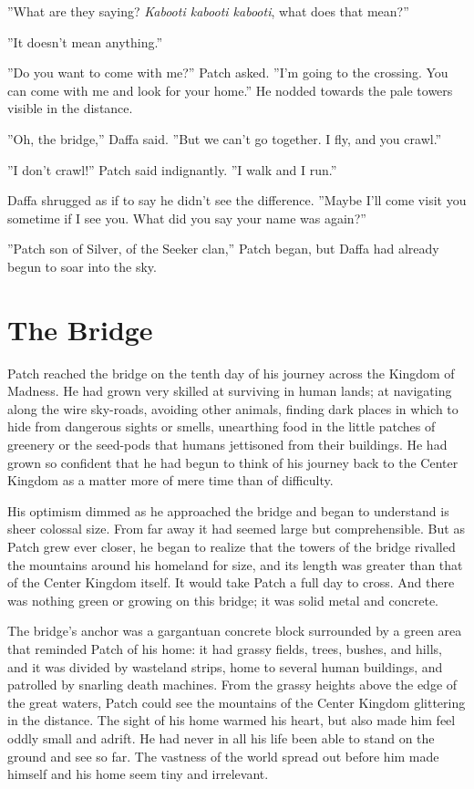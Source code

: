 \documentclass[12pt]{book}
\begin{document}
''What are they saying? {\it Kabooti kabooti kabooti}, what does that mean?''

''It doesn't mean anything.''

''Do you want to come with me?'' Patch asked. ''I'm going to the crossing. You can come with me and look for your home.'' He nodded towards the pale towers visible in the distance.

''Oh, the bridge,'' Daffa said. ''But we can't go together. I fly, and you crawl.''

''I don't crawl!'' Patch said indignantly. ''I walk and I run.''

Daffa shrugged as if to say he didn't see the difference. ''Maybe I'll come visit you sometime if I see you. What did you say your name was again?''

''Patch son of Silver, of the Seeker clan,'' Patch began, but Daffa had already begun to soar into the sky.


\section{The Bridge}

Patch reached the bridge on the tenth day of his journey across the Kingdom of Madness. He had grown very skilled at surviving in human lands; at navigating along the wire sky-roads, avoiding other animals, finding dark places in which to hide from dangerous sights or smells, unearthing food in the little patches of greenery or the seed-pods that humans jettisoned from their buildings. He had grown so confident that he had begun to think of his journey back to the Center Kingdom as a matter more of mere time than of difficulty.

His optimism dimmed as he approached the bridge and began to understand is sheer colossal size. From far away it had seemed large but comprehensible. But as Patch grew ever closer, he began to realize that the towers of the bridge rivalled the mountains around his homeland for size, and its length was greater than that of the Center Kingdom itself. It would take Patch a full day to cross. And there was nothing green or growing on this bridge; it was solid metal and concrete.

The bridge's anchor was a gargantuan concrete block surrounded by a green area that reminded Patch of his home: it had grassy fields, trees, bushes, and hills, and it was divided by wasteland strips, home to several human buildings, and patrolled by snarling death machines. From the grassy heights above the edge of the great waters, Patch could see the mountains of the Center Kingdom glittering in the distance. The sight of his home warmed his heart, but also made him feel oddly small and adrift. He had never in all his life been able to stand on the ground and see so far. The vastness of the world spread out before him made himself and his home seem tiny and irrelevant.
\end{document}
